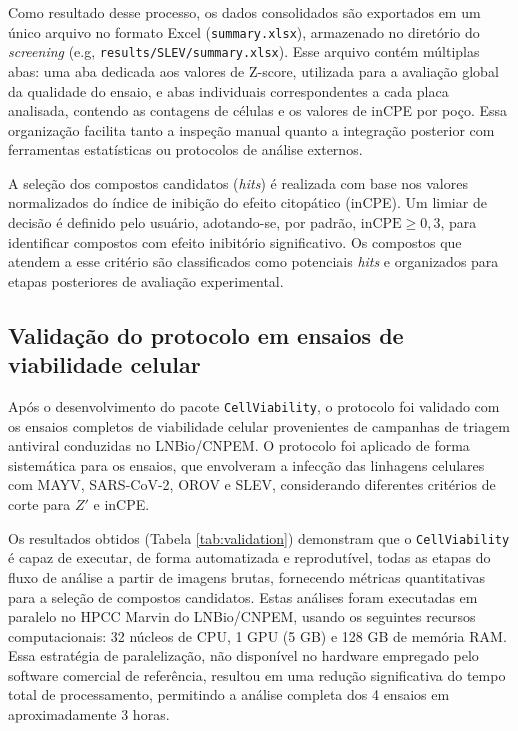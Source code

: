 \documentclass[12pt]{article}
\def\eg{e.g\onedot} \def\Eg{E.g\onedot}
\begin{document}
Como resultado desse processo, os dados consolidados são exportados em um único arquivo no formato Excel (\texttt{summary.xlsx}), armazenado no diretório do \textit{screening} (\eg, \texttt{results/SLEV/summary.xlsx}). Esse arquivo contém múltiplas abas: uma aba dedicada aos valores de Z-score, utilizada para a avaliação global da qualidade do ensaio, e abas individuais correspondentes a cada placa analisada, contendo as contagens de células e os valores de inCPE por poço. Essa organização facilita tanto a inspeção manual quanto a integração posterior com ferramentas estatísticas ou protocolos de análise externos.

A seleção dos compostos candidatos (\textit{hits}) é realizada com base nos valores normalizados do índice de inibição do efeito citopático (inCPE). Um limiar de decisão é definido pelo usuário, adotando-se, por padrão, $\mathrm{inCPE} \ge 0,3$, para identificar compostos com efeito inibitório significativo. Os compostos que atendem a esse critério são classificados como potenciais \textit{hits} e organizados para etapas posteriores de avaliação experimental.

\subsection{Validação do protocolo em ensaios de viabilidade celular}

Após o desenvolvimento do pacote \texttt{CellViability}, o protocolo foi validado com os ensaios completos de viabilidade celular provenientes de campanhas de triagem antiviral conduzidas no LNBio/CNPEM. O protocolo foi aplicado de forma sistemática para os ensaios, que envolveram a infecção das linhagens celulares com MAYV, SARS-CoV-2, OROV e SLEV, considerando diferentes critérios de corte para $Z'$ e inCPE.

Os resultados obtidos (Tabela \ref{tab:validation}) demonstram que o \texttt{CellViability} é capaz de executar, de forma automatizada e reprodutível, todas as etapas do fluxo de análise a partir de imagens brutas, fornecendo métricas quantitativas para a seleção de compostos candidatos. Estas análises foram executadas em paralelo no HPCC Marvin do LNBio/CNPEM, usando os seguintes recursos computacionais: 32 núcleos de CPU, 1 GPU (5 GB) e 128 GB de memória RAM. Essa estratégia de paralelização, não disponível no hardware empregado pelo software comercial de referência, resultou em uma redução significativa do tempo total de processamento, permitindo a análise completa dos 4 ensaios em aproximadamente 3 horas.
\end{document}
